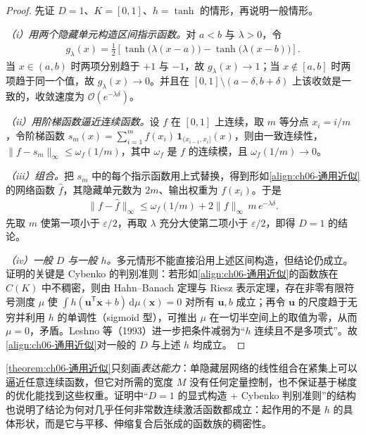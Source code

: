 \documentclass[../../main.tex]{subfiles}
\begin{document}
\begin{proof}
先证 $D=1$、$K=[0,1]$、$h=\tanh$ 的情形，再说明一般情形。

\emph{（i）用两个隐藏单元构造区间指示函数。}对 $a<b$ 与 $\lambda>0$，令
\begin{align*}
g_{\lambda}(x)=\frac{1}{2}\left[\tanh\bigl(\lambda(x-a)\bigr)-\tanh\bigl(\lambda(x-b)\bigr)\right].
\end{align*}
当 $x\in(a,b)$ 时两项分别趋于 $+1$ 与 $-1$，故 $g_\lambda(x)\to1$；当 $x\notin[a,b]$ 时两项趋于同一个值，故 $g_\lambda(x)\to0$。并且在 $[0,1]\setminus(a-\delta,b+\delta)$ 上该收敛是一致的，收敛速度为 $\mathcal{O}(e^{-\lambda\delta})$。

\emph{（ii）用阶梯函数逼近连续函数。}设 $f$ 在 $[0,1]$ 上连续，取 $m$ 等分点 $x_i=i/m$，令阶梯函数 $s_m(x)=\sum_{i=1}^{m}f(x_i)\,\mathbf{1}_{(x_{i-1},x_i]}(x)$，则由一致连续性，$\|f-s_m\|_{\infty}\leqslant\omega_f(1/m)$，其中 $\omega_f$ 是 $f$ 的连续模，且 $\omega_f(1/m)\to0$。

\emph{（iii）组合。}把 $s_m$ 中的每个指示函数用上式替换，得到形如\eqref{align:ch06-通用近似}的网络函数 $\hat f$，其隐藏单元数为 $2m$、输出权重为 $f(x_i)$。于是
\begin{align}
\|f-\hat f\|_{\infty}\leqslant\omega_f(1/m)+2\|f\|_{\infty}\,m\,e^{-\lambda\delta}.
\end{align}
先取 $m$ 使第一项小于 $\varepsilon/2$，再取 $\lambda$ 充分大使第二项小于 $\varepsilon/2$，即得 $D=1$ 的结论。

\emph{（iv）一般 $D$ 与一般 $h$。}多元情形不能直接沿用上述区间构造，但结论仍成立。证明的关键是 Cybenko 的判别准则：若形如\eqref{align:ch06-通用近似}的函数族在 $C(K)$ 中不稠密，则由 Hahn--Banach 定理与 Riesz 表示定理，存在非零有限符号测度 $\mu$ 使 $\int h(\boldsymbol{u}^{\mathsf T}\boldsymbol{x}+b)\,\mathrm{d}\mu(\boldsymbol{x})=0$ 对所有 $\boldsymbol{u},b$ 成立；再令 $\boldsymbol{u}$ 的尺度趋于无穷并利用 $h$ 的单调性（sigmoid 型），可推出 $\mu$ 在一切半空间上的取值为零，从而 $\mu=0$，矛盾。Leshno 等（1993）进一步把条件减弱为“$h$ 连续且不是多项式”。故\eqref{align:ch06-通用近似}对一般的 $D$ 与上述 $h$ 均成立。
\end{proof}

\begin{remark}\cref{theorem:ch06-通用近似}只刻画\emph{表达能力}：单隐藏层网络的线性组合在紧集上可以逼近任意连续函数，但它对所需的宽度 $M$ 没有任何定量控制，也不保证基于梯度的优化能找到这些权重。证明中“$D=1$ 的显式构造 + Cybenko 判别准则”的结构也说明了结论为何对几乎任何非常数连续激活函数都成立：起作用的不是 $h$ 的具体形状，而是它与平移、伸缩复合后张成的函数族的稠密性。
\end{remark}
\end{document}
